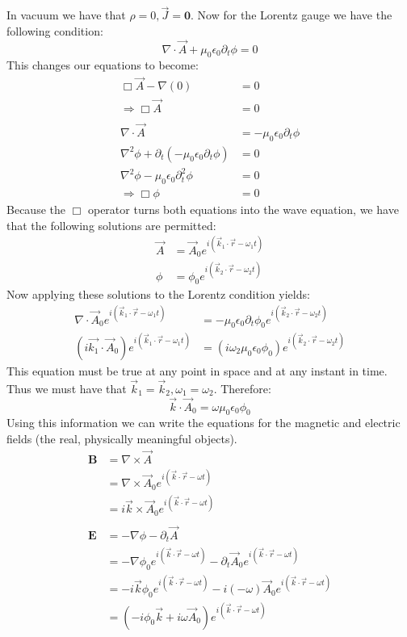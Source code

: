 \documentclass[a4paper, 11pt]{article}
\begin{document}
In vacuum we have that $\rho = 0, \vec{J} = \mathbf{0}$. Now for the Lorentz gauge we have the following condition: 
	\begin{equation}
		\nabla \cdot \vec{A} +\mu_0\epsilon_0\partial_t \phi = 0 
	\end{equation}
This changes our equations to become: 
	\begin{align*}
		\Box \vec{A} - \nabla(0) &= 0 \\ 
		\Rightarrow \Box\vec{A} &= 0 \\ 
		\\ 
		\nabla \cdot \vec{A} &= -\mu_0\epsilon_0\partial_t\phi \\ 
		\nabla^2\phi + \partial_t(-\mu_0\epsilon_0\partial_t\phi) &= 0 \\ 
		\nabla^2\phi - \mu_0\epsilon_0\partial_t^2\phi &= 0 \\ 
		\Rightarrow \Box \phi &= 0 
	\end{align*}
Because the $\Box$ operator turns both equations into the wave equation, we have that the following solutions are permitted: 	
	\begin{align*}
		\vec{A} &= \vec{A}_0e^{i(\vec{k}_1\cdot\vec{r}-\omega_1t)} \\ 
		\phi &= \phi_0e^{i(\vec{k}_2\cdot\vec{r}-\omega_2t)}  
	\end{align*}
Now applying these solutions to the Lorentz condition yields: 
	\begin{align*}
		\nabla \cdot \vec{A}_0e^{i(\vec{k}_1\cdot\vec{r}-\omega_1t)} &= -\mu_0\epsilon_0\partial_t\phi_0e^{i(\vec{k}_2\cdot\vec{r}-\omega_2t)} \\
		(i\vec{k_1}\cdot\vec{A}_0)e^{i(\vec{k}_1\cdot\vec{r}-\omega_1t)} &= (i\omega_2\mu_0\epsilon_0\phi_0)e^{i(\vec{k}_2\cdot\vec{r}-\omega_2t)}
	\end{align*}
This equation must be true at any point in space and at any instant in time. Thus we must have that $\vec{k}_1 =\vec{k}_2, \omega_1=\omega_2$. Therefore: 
	\begin{equation}
		\vec{k} \cdot \vec{A}_0  = \omega\mu_0\epsilon_0\phi_0
	\end{equation}
Using this information we can write the equations for the magnetic and electric fields (the real, physically meaningful objects). 
	\begin{align*}
		\mathbf{B} 	&= \nabla \times \vec{A} \\ 
					&= \nabla \times \vec{A}_0e^{i(\vec{k}\cdot\vec{r}-\omega t)} \\
					&= i\vec{k}\times\vec{A}_0e^{i(\vec{k}\cdot\vec{r}-\omega t)} \\ 
					\\
		\mathbf{E} 	&= -\nabla \phi - \partial_t \vec{A}\\
					&= -\nabla\phi_0e^{i(\vec{k}\cdot\vec{r}-\omega t)}- \partial_t\vec{A}_0e^{i(\vec{k}\cdot\vec{r}-\omega t)} \\ 
					&=-i\vec{k}\phi_0e^{i(\vec{k}\cdot\vec{r}-\omega t)}-i(-\omega)\vec{A}_0e^{i(\vec{k}\cdot\vec{r}-\omega t)} \\ 
					&=(-i\phi_0\vec{k}+i\omega\vec{A}_0)e^{i(\vec{k}\cdot\vec{r}-\omega t)}
	\end{align*}
\end{document}
